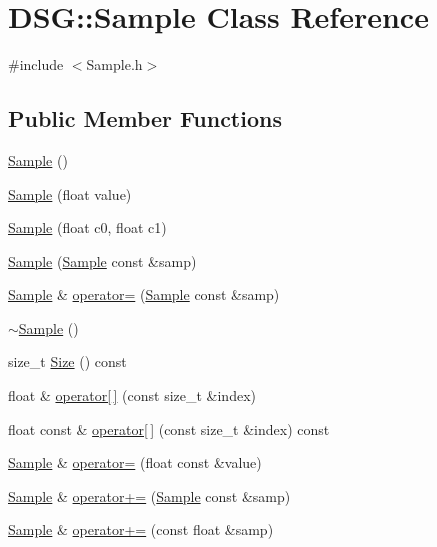 \hypertarget{classDSG_1_1Sample}{\section{D\+S\+G\+:\+:Sample Class Reference}
\label{classDSG_1_1Sample}
}


{\ttfamily \#include $<$Sample.\+h$>$}

\subsection*{Public Member Functions}
\begin{DoxyCompactItemize}
\item 
\hyperlink{classDSG_1_1Sample_aaf2e30d73911eccea99b53eeee15b612}{Sample} ()
\item 
\hyperlink{classDSG_1_1Sample_a9b5f59392d91826ceceec0481f677264}{Sample} (float value)
\item 
\hyperlink{classDSG_1_1Sample_a97befdd6c269432bbba374cdb51e3241}{Sample} (float c0, float c1)
\item 
\hyperlink{classDSG_1_1Sample_a4d5a42f2264c88291e49df89588dee50}{Sample} (\hyperlink{classDSG_1_1Sample}{Sample} const \&samp)
\item 
\hyperlink{classDSG_1_1Sample}{Sample} \& \hyperlink{classDSG_1_1Sample_a55248a848f30a533d51e6d0da2d4a3e2}{operator=} (\hyperlink{classDSG_1_1Sample}{Sample} const \&samp)
\item 
\hyperlink{classDSG_1_1Sample_af5a24cf30417259e03b5176cd2aadd0c}{$\sim$\+Sample} ()
\item 
size\+\_\+t \hyperlink{classDSG_1_1Sample_abcbdcc67584e4018b24eac650724eb18}{Size} () const 
\item 
float \& \hyperlink{classDSG_1_1Sample_ac0f49c86a2b59e15ba761ec308560828}{operator\mbox{[}$\,$\mbox{]}} (const size\+\_\+t \&index)
\item 
float const \& \hyperlink{classDSG_1_1Sample_a5908819bba1cd5110593ad3f66154b53}{operator\mbox{[}$\,$\mbox{]}} (const size\+\_\+t \&index) const 
\item 
\hyperlink{classDSG_1_1Sample}{Sample} \& \hyperlink{classDSG_1_1Sample_a8eb7f791c233ade5218bc4186e390c2e}{operator=} (float const \&value)
\item 
\hyperlink{classDSG_1_1Sample}{Sample} \& \hyperlink{classDSG_1_1Sample_a608fc9b6936c9695e35c39b33623f0d9}{operator+=} (\hyperlink{classDSG_1_1Sample}{Sample} const \&samp)
\item 
\hyperlink{classDSG_1_1Sample}{Sample} \& \hyperlink{classDSG_1_1Sample_aa1467c3ac617c8920131be21be90c55e}{operator+=} (const float \&samp)

\end{DoxyCompactItemize}
